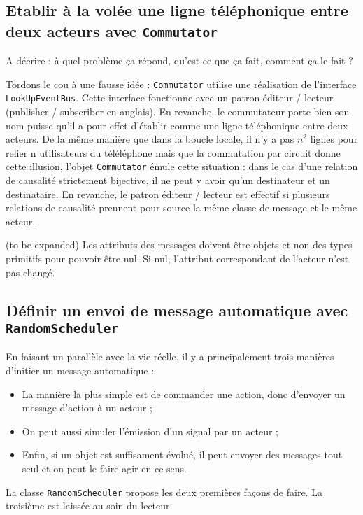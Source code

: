 \documentclass[11pt]{article}
\begin{document}
\subsection{Etablir à la volée une ligne téléphonique entre deux acteurs avec \texttt{Commutator}}

A décrire : à quel problème ça répond, qu'est-ce que ça fait, comment ça le fait ?

Tordons le cou à une fausse idée : \texttt{Commutator} utilise une réalisation de l'interface \texttt{LookUpEventBus}. Cette interface fonctionne avec un patron éditeur / lecteur (\og publisher / subscriber \fg{} en anglais). En revanche, le commutateur porte bien son nom puisse qu'il a pour effet d'établir comme une ligne téléphonique entre deux acteurs. De la même manière que dans la boucle locale, il n'y a pas $n^2$ lignes pour relier n utilisateurs du téléléphone mais que la commutation par circuit donne cette illusion, l'objet \texttt{Commutator} émule cette situation : dans le cas d'une relation de causalité strictement bijective, il ne peut y avoir qu'un destinateur et un destinataire. En revanche, le patron éditeur / lecteur est effectif si plusieurs relations de causalité prennent pour source la même classe de message et le même acteur.

(to be expanded) Les attributs des messages doivent être objets et non des types primitifs pour pouvoir être nul. Si nul, l'attribut correspondant de l'acteur n'est pas changé.

\subsection{Définir un envoi de message automatique avec \texttt{RandomScheduler}}

En faisant un parallèle avec la vie réelle, il y a principalement trois manières d'initier un message automatique :
\begin{itemize}
\item La manière la plus simple est de commander une action, donc d'envoyer un message d'action à un acteur ;
\item On peut aussi simuler l'émission d'un signal par un acteur ;
\item Enfin, si un objet est suffisament évolué, il peut envoyer des messages tout seul et on peut le faire agir en ce sens.
\end{itemize}

La classe \texttt{RandomScheduler} propose les deux premières façons de faire. La troisième est laissée au soin du lecteur.
\end{document}
